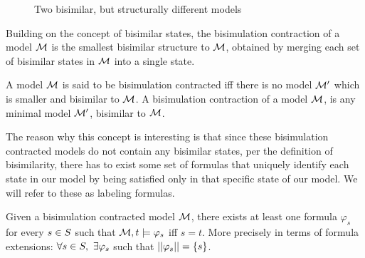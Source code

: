 \begin{figure}[h]
	\centering
	\caption{Two bisimilar, but structurally different models}
	\label{fig:bisimmods}
\end{figure}

Building on the concept of bisimilar states, the bisimulation contraction of a model $\mathcal{M}$ is the smallest bisimilar structure to $\mathcal{M}$, obtained by merging each set of bisimilar states in $\mathcal{M}$ into a single state. 

\begin{definition}
	\label{def:bisimContract}
	A model $\mathcal{M}$ is said to be bisimulation contracted iff there is no model $\mathcal{M}'$ which is smaller and bisimilar to $\mathcal{M}$. A bisimulation contraction of a model $\mathcal{M}$, is any minimal model $\mathcal{M}'$, bisimilar to $\mathcal{M}$.
\end{definition}

The reason why this concept is interesting is that since these bisimulation contracted models do not contain any bisimilar states, per the definition of bisimilarity, there has to exist some set of formulas that uniquely identify each state in our model by being satisfied only in that specific state of our model. We will refer to these as labeling formulas.

\begin{definition}
	\label{def:label}
	Given a bisimulation contracted model $\mathcal{M}$, there exists at least one formula $\varphi_s$ for every $s\in S$ such that $\mathcal{M},t \models \varphi_s$ iff $s = t$. More precisely in terms of formula extensions: 
	\centering
	$\forall s\in S,~\exists\varphi_s$ such that $||\varphi_s|| = \{s\}$.
\end{definition}

